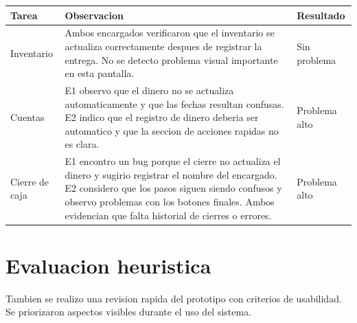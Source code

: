 \documentclass[12pt,letterpaper]{article}
\begin{document}
\vspace{6pt}

\begin{center}
\small
\begin{tabularx}{\textwidth}{|B{3.3cm}|Y|B{2.4cm}|}
\hline
Tarea & Observacion & Resultado \\
\hline
Inventario & Ambos encargados verificaron que el inventario se actualiza correctamente despues de registrar la entrega. No se detecto problema visual importante en esta pantalla. & Sin problema \\
\hline
Cuentas & E1 observo que el dinero no se actualiza automaticamente y que las fechas resultan confusas. E2 indico que el registro de dinero deberia ser automatico y que la seccion de acciones rapidas no es clara. & Problema alto \\
\hline
Cierre de caja & E1 encontro un bug porque el cierre no actualiza el dinero y sugirio registrar el nombre del encargado. E2 considero que los pasos siguen siendo confusos y observo problemas con los botones finales. Ambos evidencian que falta historial de cierres o errores. & Problema alto \\
\hline
\end{tabularx}
\end{center}

\vspace{6pt}

\section{Evaluacion heuristica}

Tambien se realizo una revision rapida del prototipo con criterios de usabilidad. Se priorizaron aspectos visibles durante el uso del sistema.
\end{document}
